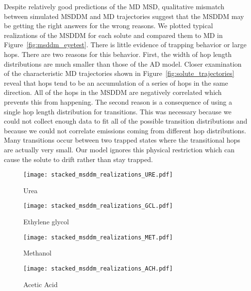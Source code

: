 \documentclass[journal=ancac3,manuscript=article,layout=twocolumn]{achemso}
\begin{document}
  Despite relatively good predictions of the MD MSD, qualitative mismatch
  between simulated MSDDM and MD trajectories suggest that the MSDDM may be
  getting the right answers for the wrong reasons. We plotted typical
  realizations of the MSDDM for each solute and compared them to MD in
  Figure~\ref{fig:msddm_eyetest}. There is little evidence of trapping behavior
  or large hops. There are two reasons for this behavior. First, the width of
  hop length distributions are much smaller than those of the AD model. Closer
  examination of the characteristic MD trajectories shown in
  Figure~\ref{fig:solute_trajectories} reveal that hops tend to be an
  accumulation of a series of hops in the same direction. All of the hops in
  the MSDDM are negatively correlated which prevents this from happening. The
  second reason is a consequence of using a single hop length distribution for
  transitions. This was necessary because we could not collect enough data to
  fit all of the possible transition distributions and because we could not
  correlate emissions coming from different hop distributions. Many
  transitions occur between two trapped states where the transitional hops are
  actually very small. Our model ignores this physical restriction which can
  cause the solute to drift rather than stay trapped.
  
  \begin{figure*}
  \centering
  \begin{subfigure}{0.24\textwidth}
  \texttt{[image: stacked\_msddm\_realizations\_URE.pdf]}
  \caption{Urea}\label{fig:stacked_msddm_realizations_URE}
  \end{subfigure}
  \begin{subfigure}{0.24\textwidth}
  \texttt{[image: stacked\_msddm\_realizations\_GCL.pdf]}
  \caption{Ethylene glycol}\label{fig:stacked_msddm_realizations_GCL}
  \end{subfigure}
  \begin{subfigure}{0.24\textwidth}
  \texttt{[image: stacked\_msddm\_realizations\_MET.pdf]}
  \caption{Methanol}\label{fig:stacked_msddm_realizations_MET}
  \end{subfigure}
  \begin{subfigure}{0.24\textwidth}
  \texttt{[image: stacked\_msddm\_realizations\_ACH.pdf]}
  \caption{Acetic Acid}\label{fig:stacked_msddm_realizations_ACH}
  \end{subfigure}
  \caption{Realizations of the MSDDM for each solute (blue) do not reproduce
	  the hopping and trapping behavior observed in our MD simulations
	  (black). The trajectories are qualitatively similar to what one
	  might expect for Brownian motion even though the MSDs are often similar
	  to the atomistic systems.
  	  }\label{fig:msddm_eyetest}
  \end{figure*}
  
\end{document}
